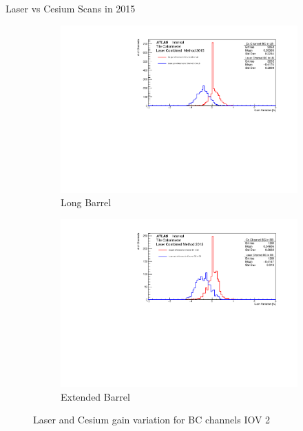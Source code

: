 \documentclass{beamer}
\begin{document}
\begin{frame}{Laser vs Cesium Scans in 2015}
\begin{figure}[H]
\centering
\begin{subfigure} [t] {0.49\textwidth}
\includegraphics[width=\textwidth]{cs1d_bc_lb_iov2.pdf}
\caption{Long Barrel}
\end{subfigure}
\begin{subfigure} [t] {0.49\textwidth}
\includegraphics[width=\textwidth]{cs1d_bc_eb_iov2.pdf}
\caption{Extended Barrel}
\end{subfigure}
\caption{Laser and Cesium gain variation for BC channels IOV 2}
\end{figure}
\end{frame}
\end{document}
